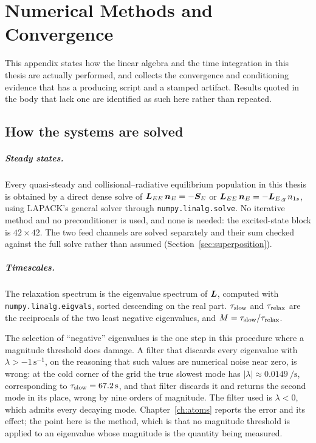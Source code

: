 \chapter{Numerical Methods and Convergence}
\label{app:numerics}

This appendix states how the linear algebra and the time integration in this
thesis are actually performed, and collects the convergence and conditioning
evidence that has a producing script and a stamped artifact. Results quoted in
the body that lack one are identified as such here rather than repeated.

\section{How the systems are solved}

\paragraph{Steady states.} Every quasi-steady and collisional--radiative
equilibrium population in this thesis is obtained by a direct dense solve of
$\bm{L}_{EE}\,\bm{n}_E = -\bm{S}_E$ or
$\bm{L}_{EE}\,\bm{n}_E = -\bm{L}_{E,g}\,n_{1s}$, using LAPACK's general solver
through \texttt{numpy.linalg.solve}. No iterative method and no preconditioner
is used, and none is needed: the excited-state block is $42 \times 42$. The two
feed channels are solved separately and their sum checked against the full solve
rather than assumed (Section~\ref{sec:superposition}).

\paragraph{Timescales.} The relaxation spectrum is the eigenvalue spectrum of
$\bm{L}$, computed with \texttt{numpy.linalg.eigvals}, sorted descending on the
real part. $\tau_{\mathrm{slow}}$ and $\tau_{\mathrm{relax}}$ are the reciprocals of the two least
negative eigenvalues, and $M = \tau_{\mathrm{slow}}/\tau_{\mathrm{relax}}$.

The selection of ``negative'' eigenvalues is the one step in this procedure
where a magnitude threshold does damage. A filter that discards every
eigenvalue with $\lambda > -1\,\mathrm{s^{-1}}$, on the reasoning that such
values are numerical noise near zero, is wrong: at the cold corner of the
grid the true slowest mode has $|\lambda| \approx \SI{0.0149}{\per\second}$,
corresponding to $\tau_{\mathrm{slow}} = \SI{67.2}{\second}$, and that filter discards it and
returns the second mode in its place, wrong by nine orders of magnitude. The
filter used is $\lambda < 0$, which admits every decaying mode. Chapter~\ref{ch:atoms}
reports the error and its effect; the point here is the method, which is that no
magnitude threshold is applied to an eigenvalue whose magnitude is the quantity
being measured.


